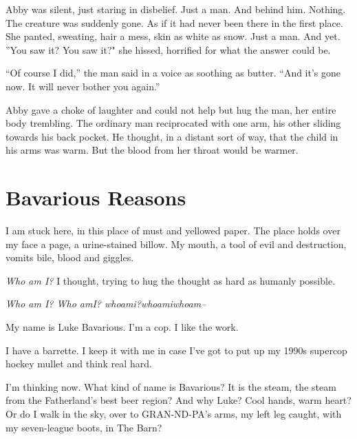 Abby was silent, just staring in disbelief. Just a man. And behind
him. Nothing. The creature was suddenly gone. As if it had never
been there in the first place. She panted, sweating, hair a mess,
skin as white as snow. Just a man. And yet. ''You saw it? You saw
it?" she hissed, horrified for what the answer could be.



``Of course I did,'' the man said in a voice as soothing
as butter. ``And it's gone now. It will never bother you
again.''



Abby gave a choke of laughter and could not help but hug the man,
her entire body trembling. The ordinary man reciprocated with one
arm, his other sliding towards his back pocket. He thought, in a
distant sort of way, that the child in his arms was warm. But the
blood from her throat would be warmer. 

 



\chapter{Bavarious Reasons}





I am stuck here, in this place of must and yellowed paper. The
place holds over my face a page, a urine-stained billow. My mouth,
a tool of evil and destruction, vomits bile, blood and
giggles.



{\em Who am I?} I thought, trying to hug the thought as hard as
humanly possible.



{\em Who am I? Who amI? whoami?whoamiwhoam--}





My name is Luke Bavarious. I'm a cop. I like the work.



I have a barrette. I keep it with me in case I've got to put up my
1990s supercop hockey mullet and think real hard.



I'm thinking now. What kind of name is Bavarious? It is the steam,
the steam from the Fatherland's best beer region? And why Luke?
Cool hands, warm heart? Or do I walk in the sky, over to
GRAN-ND-PA's arms, my left leg caught, with my seven-league boots,
in The Barn?




